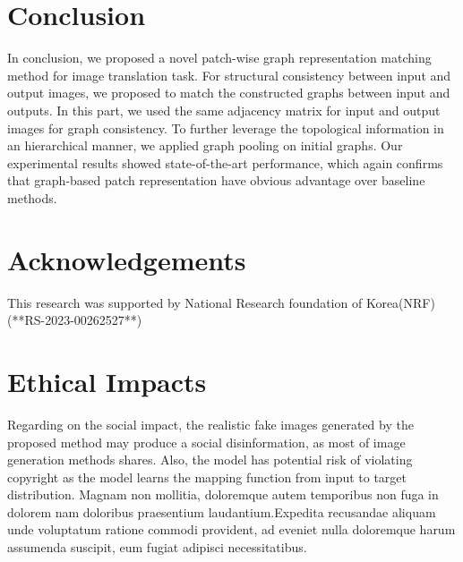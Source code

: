 \documentclass[letterpaper]{article} %
\begin{document}
\vspace{-2.09mm}
\section{Conclusion}
In conclusion, we proposed a novel patch-wise graph representation matching method for image translation task. For structural consistency between input and output images, we proposed to match the constructed graphs between input and outputs. In this part, we used the same adjacency matrix for input and output images for graph consistency. To further leverage the topological information in an hierarchical manner, we applied graph pooling on initial graphs. Our experimental results showed state-of-the-art performance, which again confirms that graph-based patch representation have obvious advantage over baseline methods.


\section{Acknowledgements}
This research was supported by National Research foundation of Korea(NRF) (**RS-2023-00262527**)

\section{Ethical Impacts}
Regarding on the social impact, the realistic fake images generated by the proposed method may produce a social disinformation, as most of image generation methods shares. Also, the model has potential risk of violating copyright as the model learns the mapping function from input to target distribution.  Magnam non mollitia, doloremque autem temporibus non fuga in dolorem nam doloribus praesentium laudantium.Expedita recusandae aliquam unde voluptatum ratione commodi provident, ad eveniet nulla doloremque harum assumenda suscipit, eum fugiat adipisci necessitatibus.\clearpage

\end{document}
